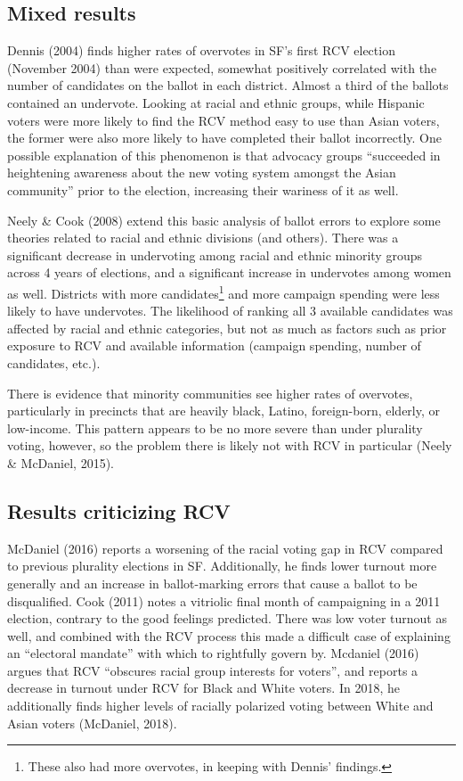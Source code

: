 \documentclass[12pt,twoside]{reedthesis}
\begin{document}
\hypertarget{mixed-results}{%
\subsection{Mixed results}\label{mixed-results}}

Dennis (2004) finds higher rates of overvotes in SF's first RCV election (November 2004) than were expected, somewhat positively correlated with the number of candidates on the ballot in each district. Almost a third of the ballots contained an undervote. Looking at racial and ethnic groups, while Hispanic voters were more likely to find the RCV method easy to use than Asian voters, the former were also more likely to have completed their ballot incorrectly. One possible explanation of this phenomenon is that advocacy groups ``succeeded in heightening awareness about the new voting system amongst the Asian community'' prior to the election, increasing their wariness of it as well.

Neely \& Cook (2008) extend this basic analysis of ballot errors to explore some theories related to racial and ethnic divisions (and others). There was a significant decrease in undervoting among racial and ethnic minority groups across 4 years of elections, and a significant increase in undervotes among women as well. Districts with more candidates\footnote{These also had more overvotes, in keeping with Dennis' findings.} and more campaign spending were less likely to have undervotes. The likelihood of ranking all 3 available candidates was affected by racial and ethnic categories, but not as much as factors such as prior exposure to RCV and available information (campaign spending, number of candidates, etc.).

There is evidence that minority communities see higher rates of overvotes, particularly in precincts that are heavily black, Latino, foreign-born, elderly, or low-income. This pattern appears to be no more severe than under plurality voting, however, so the problem there is likely not with RCV in particular (Neely \& McDaniel, 2015).

\hypertarget{results-criticizing-rcv}{%
\subsection{Results criticizing RCV}\label{results-criticizing-rcv}}

McDaniel (2016) reports a worsening of the racial voting gap in RCV compared to previous plurality elections in SF. Additionally, he finds lower turnout more generally and an increase in ballot-marking errors that cause a ballot to be disqualified. Cook (2011) notes a vitriolic final month of campaigning in a 2011 election, contrary to the good feelings predicted. There was low voter turnout as well, and combined with the RCV process this made a difficult case of explaining an ``electoral mandate'' with which to rightfully govern by. Mcdaniel (2016) argues that RCV ``obscures racial group interests for voters'', and reports a decrease in turnout under RCV for Black and White voters. In 2018, he additionally finds higher levels of racially polarized voting between White and Asian voters (McDaniel, 2018).
\end{document}
